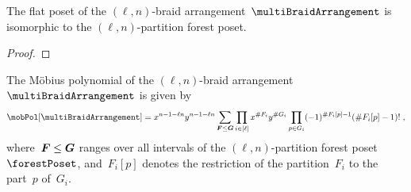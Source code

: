 

\begin{proposition}
\label{prop:flatPosetMultiBraidArrangement}
The flat poset of the $(\ell,n)$-braid arrangement~$\multiBraidArrangement$ is isomorphic to the $(\ell,n)$-partition forest poset.
\end{proposition}

\begin{proof}
\end{proof}

\begin{theorem}
\label{thm:MobiusPolynomialMultiBraidArrangement}
The M\"obius polynomial of the $(\ell,n)$-braid arrangement~$\multiBraidArrangement$ is given by
\[
\mobPol[\multiBraidArrangement] = x^{n-1-\ell n} y^{n-1-\ell n} \sum_{\b{F} \le \b{G}} \prod_{i \in [\ell]} x^{\#F_i} y^{\#G_i} \prod_{p \in G_i} (-1)^{\#F_i[p]-1} (\# F_i[p]-1)! \; ,
\]
where~$\boldsymbol{F} \le \boldsymbol{G}$ ranges over all intervals of the $(\ell,n)$-partition forest poset~$\forestPoset$, and~$F_i[p]$ denotes the restriction of the partition~$F_i$ to the part~$p$ of~$G_i$.
\end{theorem}

